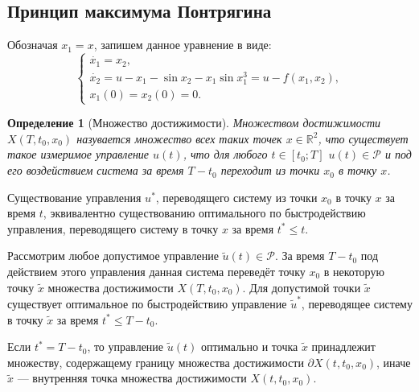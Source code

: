 \documentclass[11pt]{article}
\newtheorem{definition}{Определение}
\begin{document}
\subsection{Принцип максимума Понтрягина}
Обозначая $x_1 = x$, запишем данное уравнение в виде:
$$
\left\{
\begin{aligned}
\dot{x_1} = x_2, \\
\dot{x_2} = u - x_1 - \sin x_2 - x_1 \sin x_1^3 = u - f(x_1, x_2), \\
x_1(0) = x_2(0) = 0.
\end{aligned}
\right.
$$
\begin{definition}[Множество достижимости]
Множеством достижимости $X(T, t_0, x_0)$ назувается множество всех таких точек $x \in \mathbb{R}^2$, что существует такое измеримое управление $u(t)$, что для любого $t \in [t_0; T]$ $u(t) \in \mathcal{P}$ и под его воздействием система за время $T - t_0$ переходит из точки $x_0$ в точку $x$.
\end{definition}

Существование управления $u^*$, переводящего систему из точки $x_0$ в точку $x$ за время $t$, эквивалентно существованию оптимального по быстродействию управления, переводящего систему в точку $x$ за время $t^* \leqslant t$.

Рассмотрим любое допустимое управление $\tilde{u}(t) \in \mathcal{P}$. За время $T - t_0$ под действием этого управления данная система переведёт точку $x_0$ в некоторую точку $\tilde{x}$ множества достижимости $X(T, t_0, x_0)$. Для допустимой точки $\tilde{x}$ существует оптимальное по быстродействию управление $\tilde{u}^*$, переводящее систему в точку $\tilde{x}$ за время $t^* \leqslant T - t_0$.

Если $t^* = T - t_0$, то управление $\tilde{u}(t)$ оптимально и точка $\tilde{x}$ принадлежит множеству, содержащему границу множества достижимости $\partial X(t, t_0, x_0)$, иначе $\tilde{x}$ --- внутренняя точка множества достижимости $X(t, t_0, x_0)$.
\end{document}
